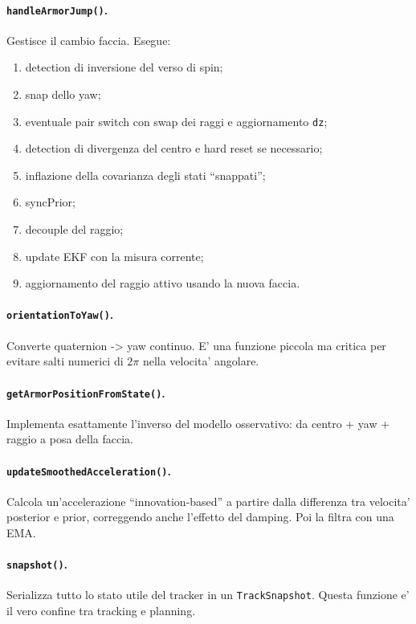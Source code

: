 \documentclass[11pt,a4paper]{article}
\newcommand{\code}[1]{\texttt{#1}}
\begin{document}
\paragraph{\code{handleArmorJump()}.}
Gestisce il cambio faccia. Esegue:
\begin{enumerate}[leftmargin=1.4em]
  \item detection di inversione del verso di spin;
  \item snap dello yaw;
  \item eventuale pair switch con swap dei raggi e aggiornamento \code{dz};
  \item detection di divergenza del centro e hard reset se necessario;
  \item inflazione della covarianza degli stati ``snappati'';
  \item syncPrior;
  \item decouple del raggio;
  \item update EKF con la misura corrente;
  \item aggiornamento del raggio attivo usando la nuova faccia.
\end{enumerate}

\paragraph{\code{orientationToYaw()}.}
Converte quaternion -> yaw continuo. E' una funzione piccola ma critica per evitare salti numerici di \(2\pi\) nella velocita' angolare.

\paragraph{\code{getArmorPositionFromState()}.}
Implementa esattamente l'inverso del modello osservativo: da centro + yaw + raggio a posa della faccia.

\paragraph{\code{updateSmoothedAcceleration()}.}
Calcola un'accelerazione ``innovation-based'' a partire dalla differenza tra velocita' posterior e prior, correggendo anche l'effetto del damping. Poi la filtra con una EMA.

\paragraph{\code{snapshot()}.}
Serializza tutto lo stato utile del tracker in un \code{TrackSnapshot}. Questa funzione e' il vero confine tra tracking e planning.
\end{document}
